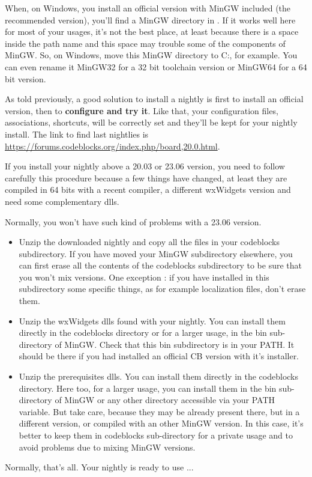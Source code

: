 When, on Windows, you install an official version with MinGW included (the recommended version), you'll find a MinGW directory in . If it works well here for most of your usages, it's not the best place, at least because there is a space inside the path name and this space may trouble some of the components of MinGW. So, on Windows, move this MinGW directory to C:, for example. You can even rename it MinGW32 for a 32 bit toolchain version or MinGW64 for a 64 bit version.

As told previously, a good solution to install a nightly is first to install an official version, then to \textbf{configure and try it}. Like that, your configuration files, associations, shortcuts, will be correctly set and they'll be kept for your nightly install. The link to find last nightlies is \url{https://forums.codeblocks.org/index.php/board,20.0.html}.

If you install your nightly above a 20.03 or 23.06 version, you need to follow carefully this procedure because a few things have changed, at least they are compiled in 64 bits with a recent compiler, a different wxWidgets version and need some complementary dlls.

Normally, you won't have such kind of problems with a 23.06 version.
\begin{itemize}
\item Unzip the downloaded nightly and copy all the files in your codeblocks subdirectory. If you have moved your MinGW subdirectory elsewhere, you can first erase all the contents of the codeblocks subdirectory to be sure that you won't mix versions. One exception : if you have installed in this subdirectory some specific things, as for example localization files, don't erase them.
\item Unzip the wxWidgets dlls found with your nightly. You can install them directly in the codeblocks directory or for a larger usage, in the bin sub-directory of MinGW. Check that this bin subdirectory is in your PATH. It should be there if you had installed an official CB version with it's installer.
\item Unzip the prerequisites dlls. You can install them directly in the codeblocks directory. Here too, for a larger usage, you can install them in the bin sub-directory of MinGW or any other directory accessible via your PATH variable. But take care, because they may be already present there, but in a different version, or compiled with an other MinGW version. In this case, it's better to keep them in codeblocks sub-directory for a private usage and to avoid problems due to mixing MinGW versions.
\end{itemize}


Normally, that's all. Your nightly is ready to use ...
